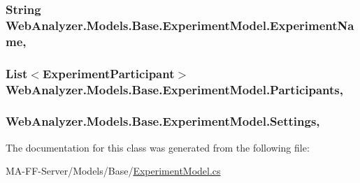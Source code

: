 \subsubsection[{Experiment\+Name}]{\setlength{\rightskip}{0pt plus 5cm}String Web\+Analyzer.\+Models.\+Base.\+Experiment\+Model.\+Experiment\+Name\hspace{0.3cm}{\ttfamily [get]}, {\ttfamily [set]}}\label{class_web_analyzer_1_1_models_1_1_base_1_1_experiment_model_ac638be077683d6707e49ca4ae481a0b1}
\hypertarget{class_web_analyzer_1_1_models_1_1_base_1_1_experiment_model_a2429c903e1bd2b062452cfa648238380}{}
\subsubsection[{Participants}]{\setlength{\rightskip}{0pt plus 5cm}List$<${\bf Experiment\+Participant}$>$ Web\+Analyzer.\+Models.\+Base.\+Experiment\+Model.\+Participants\hspace{0.3cm}{\ttfamily [get]}, {\ttfamily [set]}}\label{class_web_analyzer_1_1_models_1_1_base_1_1_experiment_model_a2429c903e1bd2b062452cfa648238380}
\hypertarget{class_web_analyzer_1_1_models_1_1_base_1_1_experiment_model_a00e6e2b80147ab73fc0eee0e7c20d856}{}
\subsubsection[{Settings}]{ Web\+Analyzer.\+Models.\+Base.\+Experiment\+Model.\+Settings\hspace{0.3cm}{\ttfamily [get]}, {\ttfamily [set]}}\label{class_web_analyzer_1_1_models_1_1_base_1_1_experiment_model_a00e6e2b80147ab73fc0eee0e7c20d856}


The documentation for this class was generated from the following file\+:\begin{DoxyCompactItemize}
\item 
M\+A-\/\+F\+F-\/\+Server/\+Models/\+Base/\hyperlink{_experiment_model_8cs}{Experiment\+Model.\+cs}\end{DoxyCompactItemize}
